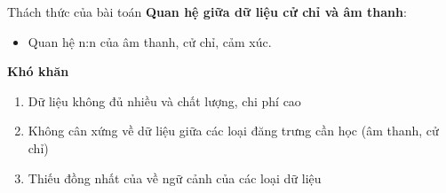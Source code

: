 \begin{frame}{Thách thức của bài toán}
	\textbf{Quan hệ giữa dữ liệu cử chỉ và âm thanh}:
	\begin{itemize}
		\item Quan hệ n:n của âm thanh, cử chỉ, cảm xúc.
	\end{itemize}
	\textbf{Khó khăn}
	\begin{enumerate}
		\item Dữ liệu không đủ nhiều và chất lượng, chi phí cao
		\item Không cân xứng về dữ liệu giữa các loại đăng trưng cần học (âm thanh, cử chỉ)
		\item Thiếu đồng nhất của về ngữ cảnh của các loại dữ liệu
	\end{enumerate}
\end{frame}


%
%



